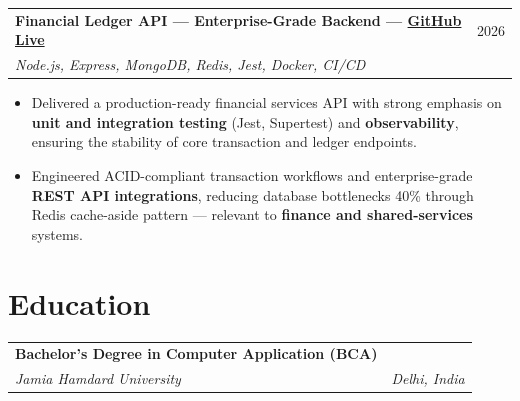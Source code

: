\documentclass[a4paper,10pt]{article}
\makeatletter
\newcommand{\resumeItem}[1]{\item\small{#1}}
\newcommand{\resumeSubheading}[4]{
  \vspace{2pt}\noindent
  \begin{tabular*}{\textwidth}{@{}l@{\extracolsep{\fill}}r@{}}
    \textbf{#1} & #2 \\
    \textit{\small #3} & \textit{\small #4} \\
  \end{tabular*}\vspace{-4pt}
}
\makeatother
\begin{document}
\vspace{2pt}

\resumeSubheading
{Financial Ledger API --- Enterprise-Grade Backend \normalfont\small --- \href{https://github.com/gitmen321/rzv_backend}{GitHub} \textbar{} \href{https://rzv-frontend.vercel.app}{Live}}{2026}
{Node.js, Express, MongoDB, Redis, Jest, Docker, CI/CD}{}

\begin{itemize}[leftmargin=0.15in, topsep=1pt, itemsep=1pt]
\resumeItem{Delivered a production-ready financial services API with strong emphasis on \textbf{unit and integration testing} (Jest, Supertest) and \textbf{observability}, ensuring the stability of core transaction and ledger endpoints.}
\resumeItem{Engineered ACID-compliant transaction workflows and enterprise-grade \textbf{REST API integrations}, reducing database bottlenecks 40\% through Redis cache-aside pattern --- relevant to \textbf{finance and shared-services} systems.}
\end{itemize}

\vspace{1pt}

\section{Education}
\resumeSubheading
{Bachelor's Degree in Computer Application (BCA)}{}
{Jamia Hamdard University}{Delhi, India}
\end{document}
